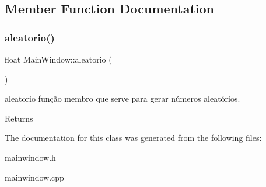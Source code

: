 \subsection{Member Function Documentation}
\mbox{\label{class_main_window_ab29e2b2ee8118c9d36c45820309a9093}} 
\subsubsection{\texorpdfstring{aleatorio()}{aleatorio()}}
{\footnotesize\ttfamily float Main\+Window\+::aleatorio (\begin{DoxyParamCaption}{ }\end{DoxyParamCaption})}



aleatorio função membro que serve para gerar números aleatórios. 

\begin{DoxyReturn}{Returns}

\end{DoxyReturn}


The documentation for this class was generated from the following files\+:\begin{DoxyCompactItemize}
\item 
mainwindow.\+h\item 
mainwindow.\+cpp\end{DoxyCompactItemize}
